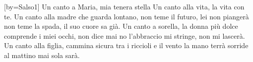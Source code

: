[by={Salso1}]
\beginchorus
Un canto a Maria, mia tenera stella
Un canto alla vita, la vita con te.
\endchorus
\beginverse
Un canto alla madre che guarda lontano,
non teme il futuro, lei non piangerà
non teme la spada, il suo cuore sa già.
Un canto a sorella, la donna più dolce
comprende i miei occhi, non dice mai no
l'abbraccio mi stringe, non mi lascerà.
Un canto alla figlia, cammina sicura
tra i riccioli e il vento la mano terrà
sorride al mattino mai sola sarà.
\endverse
\endsong
